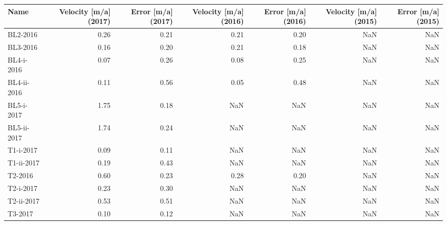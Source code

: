 \begin{tabular}{lrrrrrr}
\toprule
        Name &  Velocity [m/a] (2017) &  Error [m/a] (2017) &  Velocity [m/a] (2016) &  Error [m/a] (2016) &  Velocity [m/a] (2015) &  Error [m/a] (2015) \\
\midrule
    BL2-2016 &                   0.26 &                0.21 &                   0.21 &                0.20 &                    NaN &                 NaN \\
    BL3-2016 &                   0.16 &                0.20 &                   0.21 &                0.18 &                    NaN &                 NaN \\
  BL4-i-2016 &                   0.07 &                0.26 &                   0.08 &                0.25 &                    NaN &                 NaN \\
 BL4-ii-2016 &                   0.11 &                0.56 &                   0.05 &                0.48 &                    NaN &                 NaN \\
  BL5-i-2017 &                   1.75 &                0.18 &                    NaN &                 NaN &                    NaN &                 NaN \\
 BL5-ii-2017 &                   1.74 &                0.24 &                    NaN &                 NaN &                    NaN &                 NaN \\
   T1-i-2017 &                   0.09 &                0.11 &                    NaN &                 NaN &                    NaN &                 NaN \\
  T1-ii-2017 &                   0.19 &                0.43 &                    NaN &                 NaN &                    NaN &                 NaN \\
     T2-2016 &                   0.60 &                0.23 &                   0.28 &                0.20 &                    NaN &                 NaN \\
   T2-i-2017 &                   0.23 &                0.30 &                    NaN &                 NaN &                    NaN &                 NaN \\
  T2-ii-2017 &                   0.53 &                0.51 &                    NaN &                 NaN &                    NaN &                 NaN \\
     T3-2017 &                   0.10 &                0.12 &                    NaN &                 NaN &                    NaN &                 NaN \\

\end{tabular}
